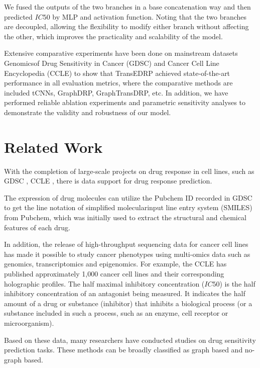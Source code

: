 \documentclass{article}
\begin{document}
We fused the outputs of the two branches in a base concatenation way and then predicted $IC50$ by MLP and activation function. Noting that the two branches are decoupled, allowing the flexibility to modify either branch without affecting the other, which improves the practicality and scalability of the model.

Extensive comparative experiments have been done on mainstream datasets Genomicsof Drug Sensitivity in Cancer (GDSC) \cite{GDSC} and Cancer Cell Line Encyclopedia (CCLE) \cite{CCLE} to show that TransEDRP achieved state-of-the-art performance in all evaluation metrics, where the comparative methods are included tCNNs, GraphDRP, GraphTransDRP, etc. In addition, we have performed reliable ablation experiments and parametric sensitivity analyses to demonstrate the validity and robustness of our model. 








\section{Related Work}

With the completion of large-scale projects on drug response in cell lines, such as GDSC \cite{GDSC}, CCLE \cite{CCLE}, there is data support for drug response prediction.

The expression of drug molecules can utilize the Pubchem ID recorded in GDSC to get the line notation of simplified molecularinput line entry system (SMILES) from Pubchem, which was initially used to extract the structural and chemical features of each drug.

In addition, the release of high-throughput sequencing data for cancer cell lines has made it possible to study cancer phenotypes using multi-omics data such as genomics, transcriptomics and epigenomics. For example, the CCLE has published approximately 1,000 cancer cell lines and their corresponding holographic profiles. The half maximal inhibitory concentration ($IC50$) is the half inhibitory concentration of an antagonist being measured. It indicates the half amount of a drug or substance (inhibitor) that inhibits a biological process (or a substance included in such a process, such as an enzyme, cell receptor or microorganism).





Based on these data, many researchers have conducted studies on drug sensitivity prediction tasks. These methods can be broadly classified as graph based and no-graph based.
\end{document}

